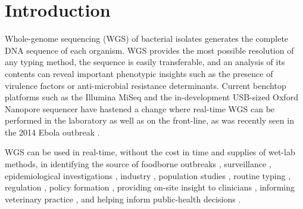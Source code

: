 \documentclass[doublespacing, linenumbers]{bmcart}
\begin{document}


\section*{Introduction}
Whole-genome sequencing (WGS) of bacterial isolates generates the complete DNA sequence of each organism. WGS provides the most possible resolution of any typing method, the sequence is easily transferable, and an analysis of its contents can reveal important phenotypic insights such as the presence of virulence factors or anti-microbial resistance determinants. Current benchtop platforms such as the Illumina MiSeq and the in-development USB-sized Oxford Nanopore sequencer have hastened a change where real-time WGS can be performed in the laboratory as well as on the front-line, as was recently seen in the 2014 Ebola outbreak \cite{jones_technology:_2015,gilchrist_whole-genome_2015,birmingham_how_2015}. 

WGS can be used in real-time, without the cost in time and supplies of wet-lab methods, in identifying the source of foodborne outbreaks \cite{graham_real-time_2014}, surveillance \cite{zankari_genotyping_2013,cody_real-time_2013},  epidemiological investigations \cite{cody_real-time_2013}, industry \cite{andreevskaya_genome_2015,mazzaglia_pseudomonas_2012}, population studies \cite{nasser_evolutionary_2014,kopac_genomic_2014}, routine typing \cite{zhang_salmonella_2015}, regulation \cite{halachev_genomic_2014}, policy formation , providing on-site insight to clinicians \cite{grad_epidemiologic_2014,jr_next-generation_2012}, informing veterinary practice \cite{biek_whole_2012}, and helping inform public-health decisions \cite{lemke_stakeholder_2015}.
\end{document}
